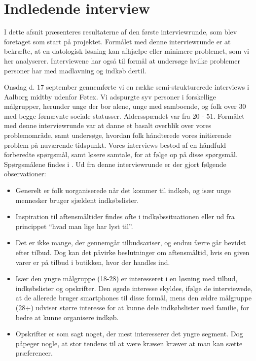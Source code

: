 \section{Indledende interview}\label{section:interview1}
I dette afsnit præsenteres resultaterne af den første interviewrunde, som blev foretaget som start på projektet.
Formålet med denne interviewrunde er at bekræfte, at en datologisk løsning kan afhjælpe eller minimere problemet, som vi her analyserer.
Interviewene har også til formål at undersøge hvilke problemer personer har med madlavning og indkøb dertil.

Onsdag d. 17 september gennemførte vi en række semi-strukturerede interviews i Aalborg midtby udenfor Føtex.
Vi adspurgte syv personer i forskellige målgrupper, herunder unge der bor alene, unge med samboende, og folk over 30 med begge førnævnte sociale statusser.
Aldersspændet var fra 20 - 51.
Formålet med denne interviewrunde var at danne et basalt overblik over vores problemområde, samt undersøge, hvordan folk håndterede vores initierende problem på nuværende tidspunkt.
Vores interviews bestod af en håndfuld forberedte spørgsmål, samt løsere samtale, for at følge op på disse spørgsmål.
Spørgsmålene findes i .
Ud fra denne interviewrunde er der gjort følgende observationer:
\begin{itemize}
	\item Generelt er folk uorganiserede når det kommer til indkøb, og især unge mennesker bruger sjældent indkøbslister.
	\item Inspiration til aftensmåltider findes ofte i indkøbssituationen eller ud fra princippet ``hvad man lige har lyst til''.
	\item Det er ikke mange, der gennemgår tilbudsaviser, og endnu færre går bevidst efter tilbud.
	Dog kan det påvirke beslutninger om aftensmåltid, hvis en given varer er på tilbud i butikken, hvor der handles ind.
	\item Især den yngre målgruppe (18-28) er interesseret i en løsning med tilbud, indkøbslister og opskrifter. Den øgede interesse skyldes, ifølge de interviewede, at de allerede bruger smartphones til disse formål, mens den ældre målgruppe (28+) udviser større interesse for at kunne dele indkøbslister med familie, for bedre at kunne organisere indkøb.
	\item Opskrifter er som sagt noget, der mest interesserer det yngre segment.
	Dog påpeger nogle, at stor tendens til at være kræsen kræver at man kan sætte præferencer.
\end{itemize}

